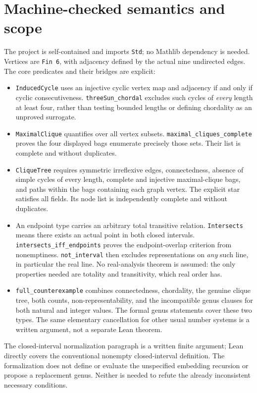 \documentclass[11pt]{article}
\begin{document}
\section{Machine-checked semantics and scope}
The project is self-contained and imports \texttt{Std}; no Mathlib dependency is needed. Vertices are \texttt{Fin 6}, with adjacency defined by the actual nine undirected edges. The core predicates and their bridges are explicit:
\begin{itemize}
\item \texttt{InducedCycle} uses an injective cyclic vertex map and adjacency if and only if cyclic consecutiveness. \texttt{threeSun\_chordal} excludes such cycles of \emph{every} length at least four, rather than testing bounded lengths or defining chordality as an unproved surrogate.
\item \texttt{MaximalClique} quantifies over all vertex subsets. \texttt{maximal\_cliques\_complete} proves the four displayed bags enumerate precisely those sets. Their list is complete and without duplicates.
\item \texttt{CliqueTree} requires symmetric irreflexive edges, connectedness, absence of simple cycles of every length, complete and injective maximal-clique bags, and paths within the bags containing each graph vertex. The explicit star satisfies all fields. Its node list is independently complete and without duplicates.
\item An endpoint type carries an arbitrary total transitive relation. \texttt{Intersects} means there exists an actual point in both closed intervals. \texttt{intersects\_iff\_endpoints} proves the endpoint-overlap criterion from nonemptiness. \texttt{not\_interval} then excludes representations on \emph{any} such line, in particular the real line. No real-analysis theorem is assumed: the only properties needed are totality and transitivity, which real order has.
\item \texttt{full\_counterexample} combines connectedness, chordality, the genuine clique tree, both counts, non-representability, and the incompatible genus clauses for both natural and integer values. The formal genus statements cover these two types. The same elementary cancellation for other usual number systems is a written argument, not a separate Lean theorem.
\end{itemize}
The closed-interval normalization paragraph is a written finite argument; Lean directly covers the conventional nonempty closed-interval definition. The formalization does not define or evaluate the unspecified embedding recursion or propose a replacement genus. Neither is needed to refute the already inconsistent necessary conditions.
\end{document}
